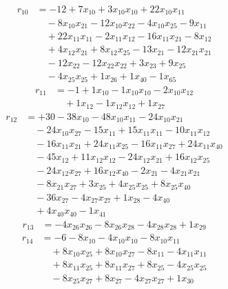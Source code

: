 \[\begin{aligned}
r_{10} &= - 12 + 7 x_{10} + 3 x_{10} x_{10} + 22 x_{10} x_{11} \\
 &\quad - 8 x_{10} x_{21} - 12 x_{10} x_{22} - 4 x_{10} x_{25} - 9 x_{11} \\
 &\quad + 22 x_{11} x_{11} - 2 x_{11} x_{12} - 16 x_{11} x_{21} - 8 x_{12} \\
 &\quad + 4 x_{12} x_{21} + 8 x_{12} x_{25} - 13 x_{21} - 12 x_{21} x_{21} \\
 &\quad - 12 x_{22} - 12 x_{22} x_{22} + 3 x_{23} + 9 x_{25} \\
 &\quad - 4 x_{25} x_{25} + 1 x_{26} + 1 x_{40} - 1 x_{65}
\end{aligned}\]
\[\begin{aligned}
r_{11} &= - 1 + 1 x_{10} - 1 x_{10} x_{10} - 2 x_{10} x_{12} \\
 &\quad + 1 x_{12} - 1 x_{12} x_{12} + 1 x_{27}
\end{aligned}\]
\[\begin{aligned}
r_{12} &= + 30 - 38 x_{10} - 48 x_{10} x_{11} - 24 x_{10} x_{21} \\
 &\quad - 24 x_{10} x_{27} - 15 x_{11} + 15 x_{11} x_{11} - 10 x_{11} x_{12} \\
 &\quad - 16 x_{11} x_{21} + 24 x_{11} x_{25} - 16 x_{11} x_{27} + 24 x_{11} x_{40} \\
 &\quad - 45 x_{12} + 11 x_{12} x_{12} - 24 x_{12} x_{21} + 16 x_{12} x_{25} \\
 &\quad - 24 x_{12} x_{27} + 16 x_{12} x_{40} - 2 x_{21} - 4 x_{21} x_{21} \\
 &\quad - 8 x_{21} x_{27} + 3 x_{25} + 4 x_{25} x_{25} + 8 x_{25} x_{40} \\
 &\quad - 36 x_{27} - 4 x_{27} x_{27} + 1 x_{28} - 4 x_{40} \\
 &\quad + 4 x_{40} x_{40} - 1 x_{41}
\end{aligned}\]
\[\begin{aligned}
r_{13} &= - 4 x_{26} x_{26} - 8 x_{26} x_{28} - 4 x_{28} x_{28} + 1 x_{29}
\end{aligned}\]
\[\begin{aligned}
r_{14} &= - 6 - 8 x_{10} - 4 x_{10} x_{10} - 8 x_{10} x_{11} \\
 &\quad + 8 x_{10} x_{25} + 8 x_{10} x_{27} - 8 x_{11} - 4 x_{11} x_{11} \\
 &\quad + 8 x_{11} x_{25} + 8 x_{11} x_{27} + 8 x_{25} - 4 x_{25} x_{25} \\
 &\quad - 8 x_{25} x_{27} + 8 x_{27} - 4 x_{27} x_{27} + 1 x_{30}
\end{aligned}\]
